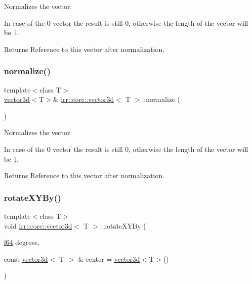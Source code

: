 Normalizes the vector. 

In case of the 0 vector the result is still 0, otherwise the length of the vector will be 1. \begin{DoxyReturn}{Returns}
Reference to this vector after normalization. 
\end{DoxyReturn}
\mbox{\label{classirr_1_1core_1_1vector3d_a84a1861464ef70e6965c146732103c09}} 
\subsubsection{\texorpdfstring{normalize()}{normalize()}\hspace{0.1cm}{\footnotesize\ttfamily [2/2]}}
{\footnotesize\ttfamily template$<$class T$>$ \\
\hyperlink{classirr_1_1core_1_1vector3d}{vector3d}$<$T$>$\& \hyperlink{classirr_1_1core_1_1vector3d}{irr\+::core\+::vector3d}$<$ T $>$\+::normalize (\begin{DoxyParamCaption}{ }\end{DoxyParamCaption})\hspace{0.3cm}{\ttfamily [inline]}}



Normalizes the vector. 

In case of the 0 vector the result is still 0, otherwise the length of the vector will be 1. \begin{DoxyReturn}{Returns}
Reference to this vector after normalization. 
\end{DoxyReturn}
\mbox{\label{classirr_1_1core_1_1vector3d_ac38b75735ec06716305fbb09ec71784d}} 
\subsubsection{\texorpdfstring{rotate\+X\+Y\+By()}{rotateXYBy()}\hspace{0.1cm}{\footnotesize\ttfamily [1/2]}}
{\footnotesize\ttfamily template$<$class T$>$ \\
void \hyperlink{classirr_1_1core_1_1vector3d}{irr\+::core\+::vector3d}$<$ T $>$\+::rotate\+X\+Y\+By (\begin{DoxyParamCaption}\item[{\hyperlink{namespaceirr_a1325b02603ad449f92c68fc640af9b28}{f64}}]{degrees,  }\item[{const \hyperlink{classirr_1_1core_1_1vector3d}{vector3d}$<$ T $>$ \&}]{center = {\ttfamily \hyperlink{classirr_1_1core_1_1vector3d}{vector3d}$<$T$>$()} }\end{DoxyParamCaption})\hspace{0.3cm}{\ttfamily [inline]}}



